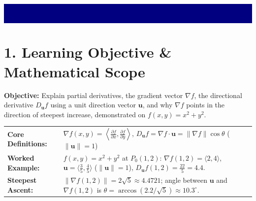 \documentclass[10pt,a4paper]{article}
\begin{document}
\noindent\colorbox{navy}{\parbox{\dimexpr\textwidth-2\fboxsep\relax}{%
\vspace{8pt}
\\[4pt]
\\[6pt]
\vspace{8pt}
}}

\vspace{8pt}

\section*{\color{slate}1. Learning Objective \& Mathematical Scope}
\textbf{Objective:} Explain partial derivatives, the gradient vector $\nabla f$, the directional derivative $D_{\mathbf{u}} f$ using a unit direction vector $\mathbf{u}$, and why $\nabla f$ points in the direction of steepest increase, demonstrated on $f(x, y) = x^2 + y^2$.

\vspace{4pt}
\noindent\colorbox{rowtint}{\parbox{\dimexpr\textwidth-2\fboxsep\relax}{%
\vspace{4pt}
\begin{tabularx}{\linewidth}{@{}l X@{}}
\textbf{Core Definitions:} & $\nabla f(x, y) = \left\langle \frac{\partial f}{\partial x}, \frac{\partial f}{\partial y} \right\rangle$, \quad $D_{\mathbf{u}} f = \nabla f \cdot \mathbf{u} = \|\nabla f\|\cos\theta$ \quad ($\|\mathbf{u}\| = 1$) \\[4pt]
\textbf{Worked Example:} & $f(x, y) = x^2 + y^2$ at $P_0(1, 2)$: $\nabla f(1,2) = \langle 2, 4\rangle$, $\mathbf{u} = \langle \frac{3}{5}, \frac{4}{5}\rangle$ ($\|\mathbf{u}\|=1$), $D_{\mathbf{u}} f(1,2) = \frac{22}{5} = 4.4$. \\[4pt]
\textbf{Steepest Ascent:} & $\|\nabla f(1,2)\| = 2\sqrt{5} \approx 4.4721$; angle between $\mathbf{u}$ and $\nabla f(1,2)$ is $\theta = \arccos(2.2/\sqrt{5}) \approx 10.3^\circ$.
\end{tabularx}
\vspace{4pt}
}}
\end{document}
